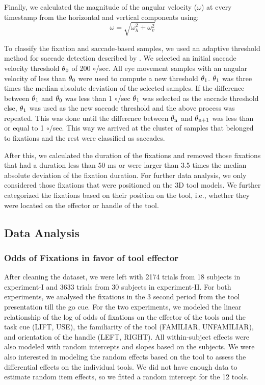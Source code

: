 Finally, we calculated the magnitude of the angular velocity ($\omega$) at every timestamp from the horizontal and vertical components using:
\begin{equation*}\label{eq:vel_angle}
     \omega = \sqrt{\omega_h^2 + \omega_v^2}
 \end{equation*}  

To classify the fixation and saccade-based samples, we used an adaptive threshold method for saccade detection described by \citet{Voloh2020-nz}.  We selected an initial saccade velocity threshold $\theta\textsubscript{0}$ of 200 $\circ$/sec. All eye movement samples with an angular velocity of less than $\theta\textsubscript{0}$ were used to compute a new threshold $\theta\textsubscript{1}$. $\theta\textsubscript{1}$ was three times the median absolute deviation of the selected samples. If the difference between $\theta\textsubscript{1}$ and $\theta\textsubscript{0}$ was less than 1 $\circ$/sec $\theta\textsubscript{1}$ was selected as the saccade threshold else, $\theta\textsubscript{1}$ was used as the new saccade threshold and the above process was repeated. This was done until the difference between $\theta\textsubscript{n}$ and $\theta\textsubscript{n+1}$ was less than or equal to 1 $\circ$/sec. This way we arrived at the cluster of samples that belonged to fixations and the rest were classified as saccades.

After this, we calculated the duration of the fixations and removed those fixations that had a duration less than 50 ms or were larger than 3.5 times the median absolute deviation of the fixation duration. For further data analysis, we only considered those fixations that were positioned on the 3D tool models. We further categorized the fixations based on their position on the tool, i.e., whether they were located on the effector or handle of the tool.


\subsection{Data Analysis}\label{sec:data_analysis}

\subsubsection{Odds of Fixations in favor of tool effector}

After cleaning the dataset, we were left with 2174 trials from 18 subjects in experiment-I and 3633 trials from 30 subjects in experiment-II. For both experiments, we analysed the fixations in the 3 second period from the tool presentation till the go cue. For the two experiments, we modeled the linear relationship of the log of odds of fixations on the effector of the tools and the task cue (LIFT, USE), the familiarity of the tool (FAMILIAR, UNFAMILIAR), and orientation of the handle (LEFT, RIGHT). All within-subject effects were also modeled with random intercepts and slopes based on the subjects. We were also interested in modeling the random effects based on the tool to assess the differential effects on the individual tools. We did not have enough data to estimate random item effects, so we fitted a random intercept for the 12 tools.

